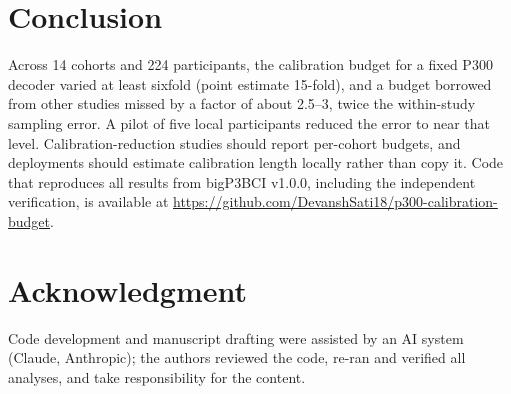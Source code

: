 \documentclass[conference]{IEEEtran}
\begin{document}
\section{Conclusion}
Across 14 cohorts and 224 participants, the calibration budget for a fixed P300 decoder varied at least sixfold (point estimate 15-fold), and a budget borrowed from other studies missed by a factor of about 2.5--3, twice the within-study sampling error. A pilot of five local participants reduced the error to near that level. Calibration-reduction studies should report per-cohort budgets, and deployments should estimate calibration length locally rather than copy it. Code that reproduces all results from bigP3BCI v1.0.0, including the independent verification, is available at \url{https://github.com/DevanshSati18/p300-calibration-budget}.

\section*{Acknowledgment}
Code development and manuscript drafting were assisted by an AI system (Claude, Anthropic); the authors reviewed the code, re-ran and verified all analyses, and take responsibility for the content.
\end{document}
